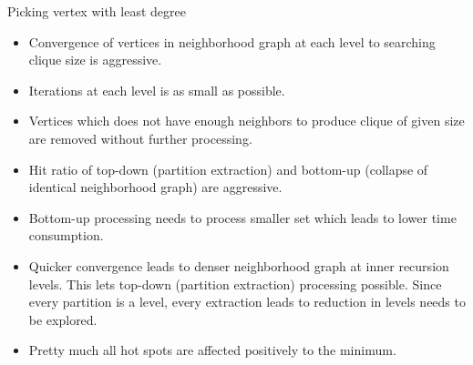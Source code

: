 \documentclass[landscape]{slides}
\begin{document}
\begin{slide}
	\begin{center}{\large Picking vertex with least degree}\end{center}
	\begin{itemize}
		\setlength{\itemsep}{0pt}
		\setlength{\parskip}{20pt}
		\setlength{\parsep}{0pt}
		\item Convergence of vertices in neighborhood graph at each level to searching clique size is aggressive.
		\item Iterations at each level is as small as possible.
		\item Vertices which does not have enough neighbors to produce clique of given size are removed without further processing.
		\item Hit ratio of top-down (partition extraction) and bottom-up (collapse of identical neighborhood graph) are aggressive.
		\item Bottom-up processing needs to process smaller set which leads to lower time consumption.
		\item Quicker convergence leads to denser neighborhood graph at inner recursion levels. This lets top-down (partition extraction) processing possible. Since every partition is a level, every extraction leads to reduction in levels needs to be explored.
		\item Pretty much all hot spots are affected positively to the minimum.
	\end{itemize}
\end{slide}

\begin{slide}
\end{slide}


\begin{slide}
	\centering
\end{slide}
\end{document}
